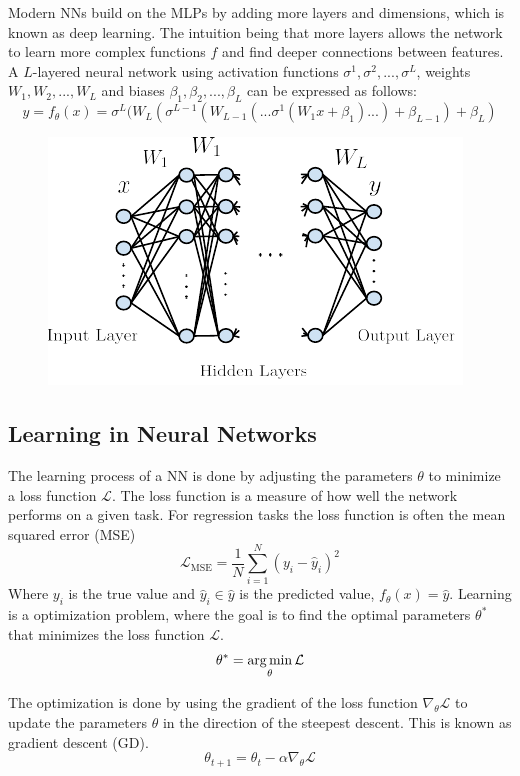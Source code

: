 Modern NNs build on the MLPs by adding more layers and dimensions, which is known as deep learning. The intuition being that more layers allows the network to learn more complex functions $f$ and find deeper connections between features.
A $L$-layered neural network using activation functions $\sigma^1, \sigma^2, ..., \sigma^L$, weights $W_1, W_2, ..., W_L$ and biases $\beta_1, \beta_2, ..., \beta_L$ can be expressed as follows:
\begin{equation}
    y = f_\theta(x) = \sigma^L(W_L(\sigma^{L-1}(W_{L-1}(...\sigma^1(W_1 x + \beta_1)...)+\beta_{L-1}) + \beta_L)
\end{equation}
\begin{figure}[H]
    \includegraphics[scale=1]{figures/figure-pdf/NN2.pdf}
\end{figure}
\subsection{Learning in Neural Networks}
The learning process of a NN is done by adjusting the parameters $\theta$ to minimize a loss function $\mathcal{L}$. The loss function is a measure of how well the network performs on a given task.
For regression tasks the loss function is often the mean squared error (MSE) 
\begin{equation}
    \mathcal{L}_\text{MSE} = \frac{1}{N}\sum_{i=1}^N (y_i - \hat{y}_i)^2
\end{equation}
Where $y_i$ is the true value and $\hat{y}_i \in \hat{y}$ is the predicted value, $f_\theta(x) = \hat{y}$.
Learning is a optimization problem, where the goal is to find the optimal parameters $\theta^*$ that minimizes the loss function $\mathcal{L}$.
\begin{equation}
    \theta^* = \operatorname*{arg\,min}_\theta \mathcal{L}
\end{equation}

The optimization is done by using the gradient of the loss function $\nabla_\theta \mathcal{L}$ to update the parameters $\theta$ in the direction of the steepest descent. This is known as gradient descent (GD).
\begin{equation}
    \theta_{t+1} = \theta_t - \alpha \nabla_\theta \mathcal{L}
\end{equation}

